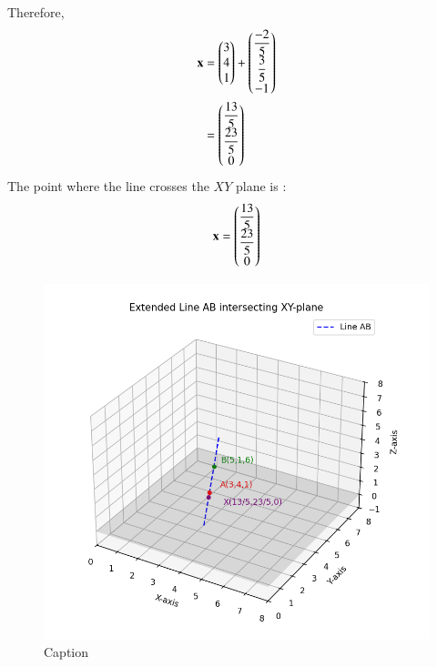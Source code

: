 \documentclass[journal]{IEEEtran}
\begin{document}
Therefore,
\begin{align}
    \mathbf{x} &= \begin{pmatrix}3\\4\\1\end{pmatrix} + \begin{pmatrix}\dfrac{-2}{5} \\ \dfrac{3}{5} \\ -1\end{pmatrix} \\
    &= \begin{pmatrix}\dfrac{13}{5} \\ \dfrac{23}{5} \\ 0\end{pmatrix}
\end{align}
The point where the line crosses the $XY$ plane is :
\begin{align}
    \mathbf{x} = \begin{pmatrix}\dfrac{13}{5} \\ \dfrac{23}{5} \\ 0\end{pmatrix}
\end{align}

\begin{figure}[H]
    \centering
    \includegraphics[width=0.8\linewidth]{figs/fig.png}
    \caption{Caption}
    \label{fig:placeholder}
\end{figure}
\end{document}
